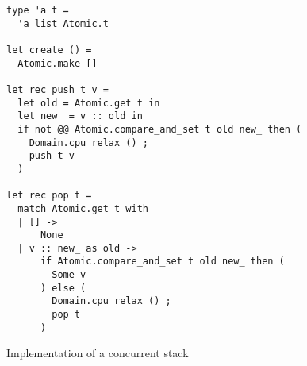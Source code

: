 \begin{figure}[t!]
\begin{verbatim}
type 'a t =
  'a list Atomic.t

let create () =
  Atomic.make []

let rec push t v =
  let old = Atomic.get t in
  let new_ = v :: old in
  if not @@ Atomic.compare_and_set t old new_ then (
    Domain.cpu_relax () ;
    push t v
  )

let rec pop t =
  match Atomic.get t with
  | [] ->
      None
  | v :: new_ as old ->
      if Atomic.compare_and_set t old new_ then (
        Some v
      ) else (
        Domain.cpu_relax () ;
        pop t
      )
\end{verbatim}
\caption{Implementation of a concurrent stack}
\label{fig:stack}
\end{figure}